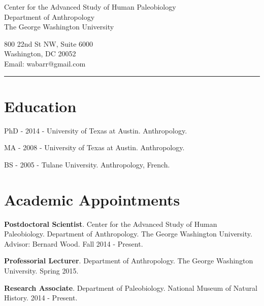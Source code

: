 \documentclass{article}
\begin{document}
\begin{center}
\end{center}

\vspace{15pt}

\noindent\begin{minipage}{.60\textwidth}
\begin{flushleft}
Center for the Advanced Study of Human Paleobiology\\
Department of Anthropology\\
The George Washington University\\
\end{flushleft}
\end{minipage}
\begin{minipage}{.395\textwidth}
\begin{flushright}
800 22nd St NW, Suite 6000\\
Washington, DC 20052 \\
Email: wabarr@gmail.com\\
\end{flushright}
\end{minipage}


\noindent\rule[-2mm]{\textwidth}{1pt}

\section*{Education}
\begin{description*}
\item[] PhD - 2014 - University of Texas at Austin. Anthropology.
\item[] MA  - 2008 - University of Texas at Austin. Anthropology.
\item[] BS  - 2005 - Tulane University. Anthropology, French.
\end{description*}


\section*{Academic Appointments}
\begin{description*}
\item[] {\bfseries Postdoctoral Scientist}. Center for the Advanced Study of Human Paleobiology. Department of Anthropology. The George Washington University. Advisor: Bernard Wood. Fall 2014 - Present.
\item[] {\bfseries Professorial Lecturer}. Department of Anthropology. The George Washington University. Spring 2015.
\item[] {\bfseries Research Associate}. Department of Paleobiology.  National Museum of Natural History. 2014 - Present.
\end{description*}
\end{document}
